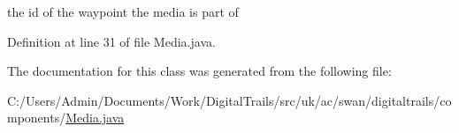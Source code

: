 the id of the waypoint the media is part of 



Definition at line 31 of file Media.\+java.



The documentation for this class was generated from the following file\+:\begin{DoxyCompactItemize}
\item 
C\+:/\+Users/\+Admin/\+Documents/\+Work/\+Digital\+Trails/src/uk/ac/swan/digitaltrails/components/\hyperlink{_media_8java}{Media.\+java}\end{DoxyCompactItemize}
